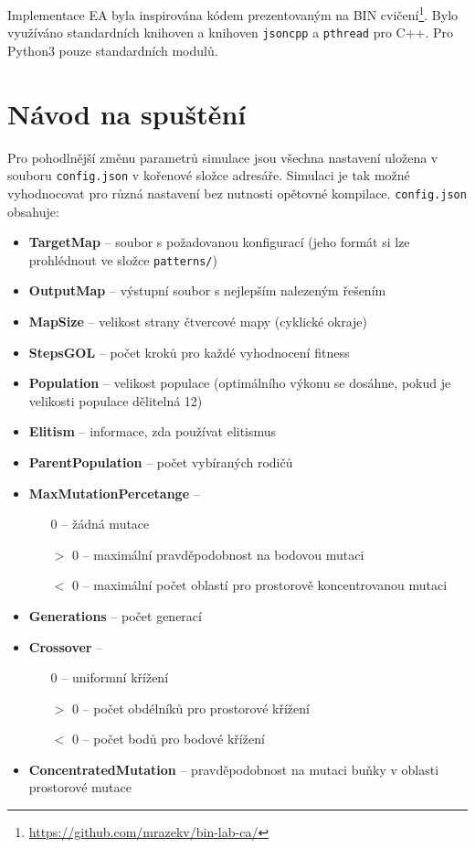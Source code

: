 \documentclass[12pt]{article}
\begin{document}
Implementace EA byla inspirována kódem prezentovaným na BIN cvičení\footnote{\url{https://github.com/mrazekv/bin-lab-ca/}}. Bylo využíváno standardních knihoven a knihoven \texttt{jsoncpp} a \texttt{pthread} pro C++. Pro Python3 pouze standardních modulů.

\section{Návod na spuštění}
\label{howtorun}
Pro pohodlnější změnu parametrů simulace jsou všechna nastavení uložena v souboru \texttt{config.json} v kořenové složce adresáře. Simulaci je tak možné vyhodnocovat pro různá nastavení bez nutnosti opětovné kompilace. \texttt{config.json} obsahuje:
\begin{itemize}
    \item \textbf{TargetMap} -- soubor s požadovanou konfigurací (jeho formát si lze prohlédnout ve složce \texttt{patterns/})
    \item \textbf{OutputMap} -- výstupní soubor s nejlepším nalezeným řešením
    \item \textbf{MapSize} -- velikost strany čtvercové mapy (cyklické okraje)
    \item \textbf{StepsGOL} -- počet kroků pro každé vyhodnocení fitness
    \item \textbf{Population} -- velikost populace (optimálního výkonu se dosáhne, pokud je velikosti populace dělitelná 12)
    \item \textbf{Elitism} -- informace, zda používat elitismus
    \item \textbf{ParentPopulation} -- počet vybíraných rodičů
    \item \textbf{MaxMutationPercetange} --
       \begin{itemize}
           \item[0] -- žádná mutace
           \item[$>$ 0] -- maximální pravděpodobnost na bodovou mutaci
           \item[$<$ 0] -- maximální počet oblastí pro prostorově koncentrovanou mutaci
       \end{itemize}
    \item \textbf{Generations} -- počet generací
    \item \textbf{Crossover} -- 
       \begin{itemize}
           \item[0] -- uniformní křížení
           \item[$>$ 0] -- počet obdélníků pro prostorové křížení
           \item[$<$ 0] -- počet bodů pro bodové křížení
       \end{itemize}
    \item \textbf{ConcentratedMutation} -- pravděpodobnost na mutaci buňky v oblasti prostorové mutace
\end{itemize}
\end{document}
